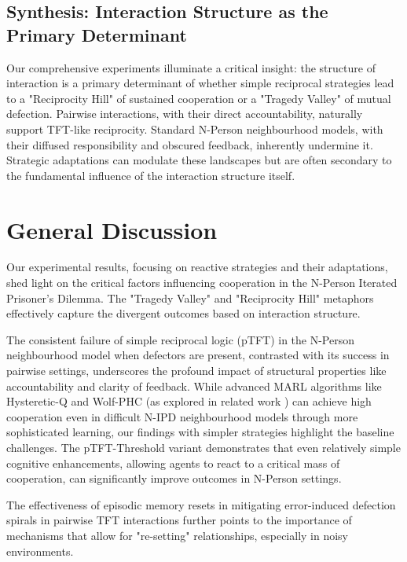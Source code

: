 \documentclass[]{llncs} %
\begin{document}
\subsection{Synthesis: Interaction Structure as the Primary Determinant}
Our comprehensive experiments illuminate a critical insight: the structure of interaction is a primary determinant of whether simple reciprocal strategies lead to a "Reciprocity Hill" of sustained cooperation or a "Tragedy Valley" of mutual defection. Pairwise interactions, with their direct accountability, naturally support TFT-like reciprocity. Standard N-Person neighbourhood models, with their diffused responsibility and obscured feedback, inherently undermine it. Strategic adaptations can modulate these landscapes but are often secondary to the fundamental influence of the interaction structure itself.


\section{General Discussion}
\label{sec:general_discussion} %
Our experimental results, focusing on reactive strategies and their adaptations, shed light on the critical factors influencing cooperation in the N-Person Iterated Prisoner's Dilemma. The "Tragedy Valley" and "Reciprocity Hill" metaphors effectively capture the divergent outcomes based on interaction structure.

The consistent failure of simple reciprocal logic (pTFT) in the N-Person neighbourhood model when defectors are present, contrasted with its success in pairwise settings, underscores the profound impact of structural properties like accountability and clarity of feedback. While advanced MARL algorithms like Hysteretic-Q and Wolf-PHC (as explored in related work \cite{TcaciHuyck2023Hysteretic, TcaciHuyck2023WoLFPHC}) can achieve high cooperation even in difficult N-IPD neighbourhood models through more sophisticated learning, our findings with simpler strategies highlight the baseline challenges. The pTFT-Threshold variant demonstrates that even relatively simple cognitive enhancements, allowing agents to react to a critical mass of cooperation, can significantly improve outcomes in N-Person settings.

The effectiveness of episodic memory resets in mitigating error-induced defection spirals in pairwise TFT interactions further points to the importance of mechanisms that allow for "re-setting" relationships, especially in noisy environments.
\end{document}
